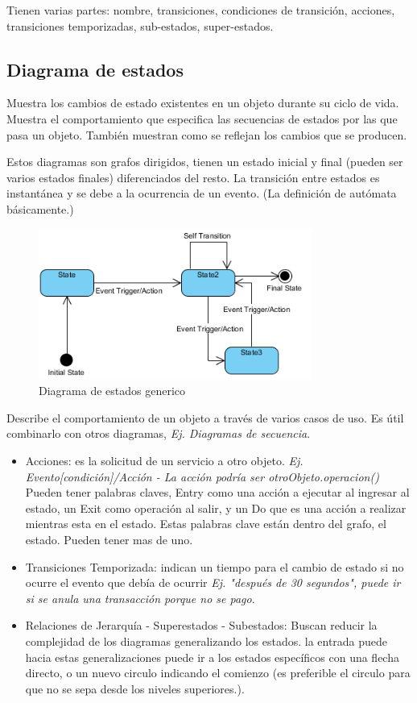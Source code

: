 \documentclass[titlepage,a4paper]{article}
\begin{document}
Tienen varias partes: nombre, transiciones, condiciones de transición, acciones, transiciones temporizadas, sub-estados, super-estados.

\subsection{Diagrama de estados}
Muestra los cambios de estado existentes en un objeto durante su ciclo de vida. Muestra el comportamiento que especifica las secuencias de estados por las que pasa un objeto. También muestran como se reflejan los cambios que se producen.

Estos diagramas son grafos dirigidos, tienen un estado inicial y final (pueden ser varios estados finales) diferenciados del resto. La transición entre estados es instantánea y se debe a la ocurrencia de un evento. (La definición de autómata básicamente.)

\begin{figure}[!htb]
    \centering
    \includegraphics[width=0.8\textwidth]{Imagenes/StateDiagram.png}
    \caption{Diagrama de estados generico}
\end{figure}

Describe el comportamiento de un objeto a través de varios casos de uso. Es útil combinarlo con otros diagramas, \textit{Ej. Diagramas de secuencia}.

\begin{itemize}
    \item Acciones: es la solicitud de un servicio a otro objeto. \textit{Ej. Evento[condición]/Acción - La acción podría ser otroObjeto.operacion()} Pueden tener palabras claves, Entry como una acción a ejecutar al ingresar al estado, un Exit como operación al salir, y un Do que es una acción a realizar mientras esta en el estado. Estas palabras clave están dentro del grafo, el estado. Pueden tener mas de uno.
    \item Transiciones Temporizada: indican un tiempo para el cambio de estado si no ocurre el evento que debía de ocurrir \textit{Ej. "después de 30 segundos", puede ir si se anula una transacción porque no se pago}.
    \item Relaciones de Jerarquía - Superestados - Subestados: Buscan reducir la complejidad de los diagramas generalizando los estados. la entrada puede hacia estas generalizaciones puede ir a los estados específicos con una flecha directo, o un nuevo circulo indicando el comienzo (es preferible el circulo para que no se sepa desde los niveles superiores.).
\end{itemize}
\end{document}
